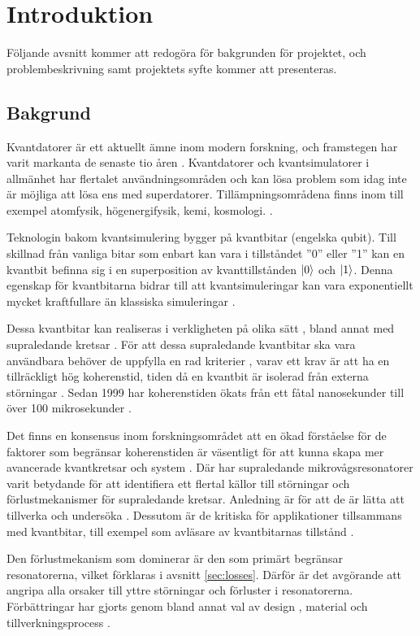\documentclass[main.tex]{subfiles}
\begin{document}
\chapter{Introduktion}
Följande avsnitt kommer att redogöra för bakgrunden för projektet, och problembeskrivning samt projektets syfte kommer att presenteras.
\section{Bakgrund}
Kvantdatorer är ett aktuellt ämne inom modern forskning, och framstegen har varit markanta de senaste tio åren \cite{Bylander2017}. Kvantdatorer och kvantsimulatorer i allmänhet har flertalet användningsområden och kan lösa problem som idag inte är möjliga att lösa ens med superdatorer. Tillämpningsområdena finns inom till exempel atomfysik, högenergifysik, kemi, kosmologi. \cite{applications}.

Teknologin bakom kvantsimulering bygger på kvantbitar (engelska qubit). Till skillnad från vanliga bitar som enbart kan vara i tillståndet ''0'' eller ''1'' kan en kvantbit befinna sig i en superposition av kvanttillstånden $\ket{0}$ och $\ket{1}$. Denna egenskap för kvantbitarna bidrar till att kvantsimuleringar kan vara exponentiellt mycket kraftfullare än klassiska simuleringar \cite{Eckstein2013}.

Dessa kvantbitar kan realiseras i verkligheten på olika sätt \cite{Eckstein2013}, bland annat med supraledande kretsar \cite{Oliver2013}. För att dessa supraledande kvantbitar ska vara användbara behöver de uppfylla en rad kriterier \cite{Eckstein2013}, varav ett krav är att ha en tillräckligt hög koherenstid, tiden då en kvantbit är isolerad från externa störningar \cite{Oliver2013}. Sedan 1999 har koherenstiden ökats från ett fåtal nanosekunder till över 100 mikrosekunder \cite{wendin2016}.

Det finns en konsensus inom forskningsområdet att en ökad förståelse för de faktorer som begränsar koherenstiden är väsentligt för att kunna skapa mer avancerade kvantkretsar och system \cite{Oliver2013}. Där har supraledande mikrovågsresonatorer varit betydande för att identifiera ett flertal källor till störningar och förlustmekanismer för supraledande kretsar. Anledning är för att de är lätta att tillverka och undersöka \cite{Oliver2013}. Dessutom är de kritiska för applikationer tillsammans med kvantbitar, till exempel som avläsare av kvantbitarnas tillstånd \cite{wendin2016}.

Den förlustmekanism som dominerar är den som primärt begränsar resonatorerna, vilket förklaras i avsnitt \ref{sec:losses}. Därför är det avgörande att angripa alla orsaker till yttre störningar och förluster i resonatorerna. Förbättringar har gjorts genom bland annat val av design \cite{khalil2011,chiaro2016}, material \cite{Goetz2016} och tillverkningsprocess \cite{Bruno2015,Sanberg2012}.
\end{document}
